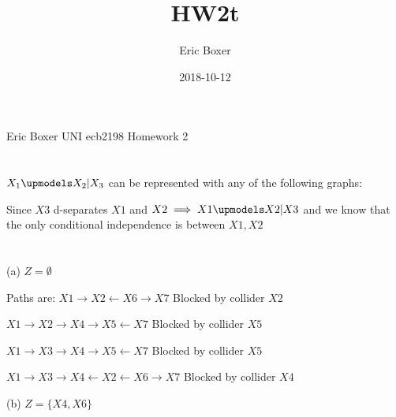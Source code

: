 \documentclass{article}
\title{HW2t}
\date{2018-10-12}
\author{Eric Boxer}
\begin{document}
\noindent Eric Boxer UNI ecb2198 Homework 2

\section{}
$X_1 \upmodels X_2 | X_3$ can be represented with any of the following graphs:


\noindent Since $X3$ d-separates $X1$ and $X2 \implies X1 \upmodels X2 | X3$ and we know that the only conditional independence is between $X1, X2$
\section{}
(a) $Z = \emptyset$

\noindent Paths are: $X1 \rightarrow X2 \leftarrow X6 \rightarrow X7$ Blocked by collider $X2$

\noindent $X1 \rightarrow X2 \rightarrow X4 \rightarrow X5 \leftarrow X7$ Blocked by collider $X5$

\noindent $X1 \rightarrow X3 \rightarrow X4 \rightarrow X5 \leftarrow X7$ Blocked by collider $X5$

\noindent $X1 \rightarrow X3 \rightarrow X4 \leftarrow X2 \leftarrow X6 \rightarrow X7$ Blocked by collider $X4$

\noindent (b) $Z = \{X4, X6 \}$
\end{document}
